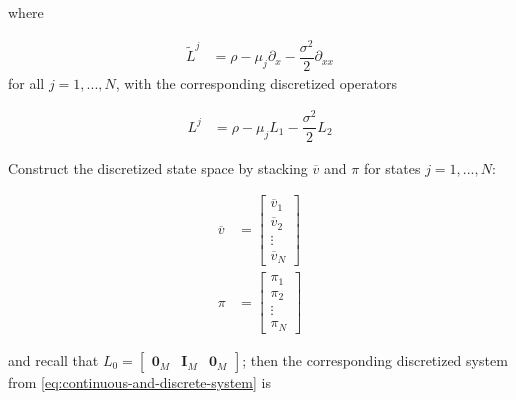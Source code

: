 \documentclass[11pt]{article}
\theoremstyle{definition}
\begin{document}
where

\begin{align}
\tilde{L}^j &= \rho - \mu_j \partial_{x} - \dfrac{\sigma^2}{2} \partial_{xx} 
\end{align}
for all $j = 1,...,N$, with the corresponding discretized operators

\begin{align}
{L}^j &= \rho - \mu_j L_1 - \dfrac{\sigma^2}{2} L_2 
\end{align}

Construct the discretized state space by stacking $\overline{v}$ and ${\pi}$ for states $j= 1, ...,N$:

\begin{align}
\overline{v} &= \begin{bmatrix}
\overline{v}_1 \\
\overline{v}_2 \\ 
\vdots \\
\overline{v}_N
\end{bmatrix} \\
\pi &= \begin{bmatrix}
\pi_1\\
\pi_2 \\
\vdots \\
\pi_N 
\end{bmatrix}
\end{align}

and recall that $L_0 = \begin{bmatrix} \mathbf{0}_M &  \mathbf{I}_M & \mathbf{0}_M  \end{bmatrix} $; then the corresponding discretized system from \eqref{eq:continuous-and-discrete-system} is
\end{document}
